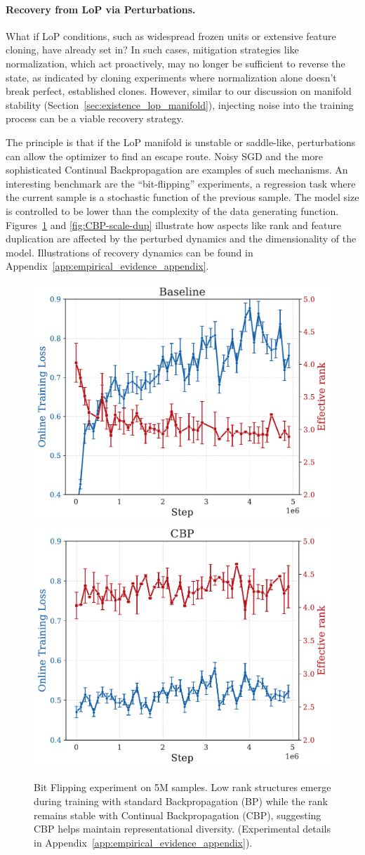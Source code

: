 \documentclass{article}
\numberwithin{figure}{section}
\begin{document}
\paragraph{Recovery from LoP via Perturbations.}
What if LoP conditions, such as widespread frozen units or extensive feature cloning, have already set in? In such cases, mitigation strategies like normalization, which act proactively, may no longer be sufficient to reverse the state, as indicated by cloning experiments where normalization alone doesn't break perfect, established clones. However, similar to our discussion on manifold stability (Section~\ref{sec:existence_lop_manifold}), injecting noise into the training process can be a viable recovery strategy.

The principle is that if the LoP manifold is unstable or saddle-like, perturbations can allow the optimizer to find an escape route. Noisy SGD and the more sophisticated Continual Backpropagation \citep{dohare2024loss} are examples of such mechanisms. An interesting benchmark are the ``bit-flipping'' experiments, a regression task where the current sample is a stochastic function of the previous sample. The model size is controlled to be lower than the complexity of the data generating function. Figures~\ref{fig:CBP-scale-rank} and \ref{fig:CBP-scale-dup} illustrate how aspects like rank and feature duplication are affected by the perturbed dynamics and the dimensionality of the model.   Illustrations of recovery dynamics can be found in Appendix~\ref{app:empirical_evidence_appendix}.
\begin{figure}[!ht]
    \centering
    \includegraphics[width=0.33\linewidth]{paper/images/bf_Baseline_rankloss_plot.pdf}
    \includegraphics[width=0.33\linewidth]{paper/images/bf_CBP_rankloss_plot.pdf}
        \vspace{-.3cm}
    \caption{Bit Flipping experiment on 5M samples. Low rank structures emerge during training with standard Backpropagation (BP) while the rank remains stable with Continual Backpropagation (CBP), suggesting CBP helps maintain representational diversity. (Experimental details in Appendix~\ref{app:empirical_evidence_appendix}).}
    \label{fig:CBP-scale-rank}
\end{figure}
\end{document}
